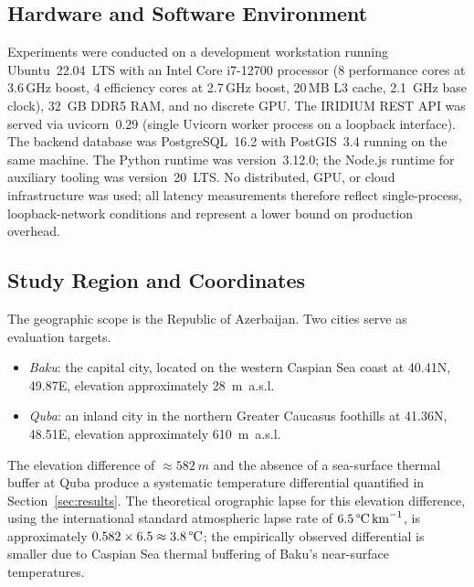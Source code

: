 
\subsection{Hardware and Software Environment}

Experiments were conducted on a development workstation running
Ubuntu~22.04~LTS with an Intel Core i7-12700 processor
(8 performance cores at 3.6\,GHz boost, 4 efficiency cores at 2.7\,GHz boost,
20\,MB L3 cache, \SI{2.1}{GHz} base clock), \SI{32}{GB} DDR5 RAM,
and no discrete GPU.
The IRIDIUM REST API was served via uvicorn~0.29 (single Uvicorn worker
process on a loopback interface).
The backend database was PostgreSQL~16.2 with PostGIS~3.4 running on the
same machine.
The Python runtime was version~3.12.0; the Node.js runtime for auxiliary
tooling was version~20~LTS.
No distributed, GPU, or cloud infrastructure was used; all latency
measurements therefore reflect single-process, loopback-network conditions
and represent a lower bound on production overhead.

\subsection{Study Region and Coordinates}

The geographic scope is the Republic of Azerbaijan.
Two cities serve as evaluation targets.

\begin{itemize}
  \item \textit{Baku}: the capital city, located on the western Caspian Sea
        coast at 40.41\textdegree{}N, 49.87\textdegree{}E,
        elevation approximately \SI{28}{m}~a.s.l.
  \item \textit{Quba}: an inland city in the northern Greater Caucasus
        foothills at 41.36\textdegree{}N, 48.51\textdegree{}E,
        elevation approximately \SI{610}{m}~a.s.l.
\end{itemize}

The elevation difference of $\approx\SI{582}{m}$ and the absence of a
sea-surface thermal buffer at Quba produce a systematic temperature
differential quantified in Section~\ref{sec:results}.
The theoretical orographic lapse for this elevation difference, using the
international standard atmospheric lapse rate of
$6.5\,\text{\textdegree{}C\,km}^{-1}$, is approximately
$0.582 \times 6.5 \approx 3.8\,\text{\textdegree{}C}$;
the empirically observed differential is smaller due to Caspian Sea
thermal buffering of Baku's near-surface temperatures.

